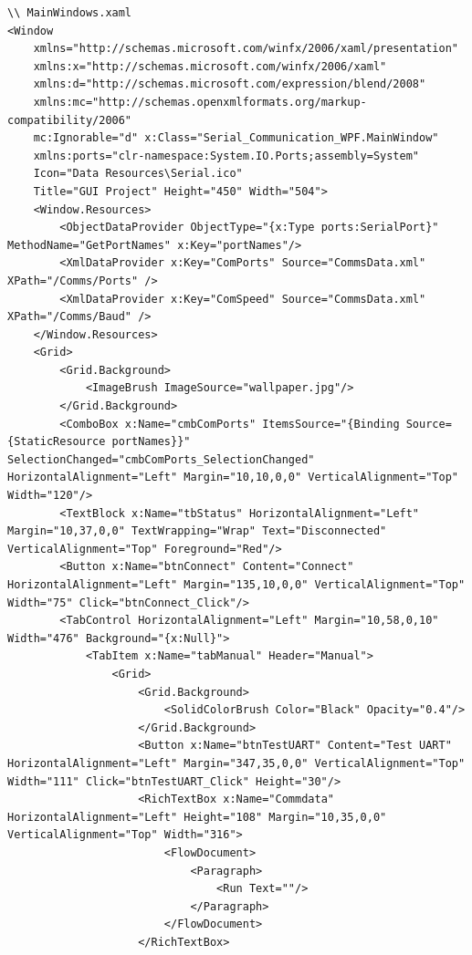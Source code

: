 \begin{lstlisting}
\\ MainWindows.xaml
<Window
	xmlns="http://schemas.microsoft.com/winfx/2006/xaml/presentation"
	xmlns:x="http://schemas.microsoft.com/winfx/2006/xaml"
    xmlns:d="http://schemas.microsoft.com/expression/blend/2008" 
    xmlns:mc="http://schemas.openxmlformats.org/markup-compatibility/2006"
    mc:Ignorable="d" x:Class="Serial_Communication_WPF.MainWindow"
    xmlns:ports="clr-namespace:System.IO.Ports;assembly=System"
    Icon="Data Resources\Serial.ico"
    Title="GUI Project" Height="450" Width="504">
    <Window.Resources>
        <ObjectDataProvider ObjectType="{x:Type ports:SerialPort}" MethodName="GetPortNames" x:Key="portNames"/>
        <XmlDataProvider x:Key="ComPorts" Source="CommsData.xml" XPath="/Comms/Ports" />
        <XmlDataProvider x:Key="ComSpeed" Source="CommsData.xml" XPath="/Comms/Baud" />
    </Window.Resources>
    <Grid>
        <Grid.Background>
            <ImageBrush ImageSource="wallpaper.jpg"/>
        </Grid.Background>
        <ComboBox x:Name="cmbComPorts" ItemsSource="{Binding Source={StaticResource portNames}}" SelectionChanged="cmbComPorts_SelectionChanged" HorizontalAlignment="Left" Margin="10,10,0,0" VerticalAlignment="Top" Width="120"/>
        <TextBlock x:Name="tbStatus" HorizontalAlignment="Left" Margin="10,37,0,0" TextWrapping="Wrap" Text="Disconnected" VerticalAlignment="Top" Foreground="Red"/>
        <Button x:Name="btnConnect" Content="Connect" HorizontalAlignment="Left" Margin="135,10,0,0" VerticalAlignment="Top" Width="75" Click="btnConnect_Click"/>
        <TabControl HorizontalAlignment="Left" Margin="10,58,0,10" Width="476" Background="{x:Null}">
            <TabItem x:Name="tabManual" Header="Manual">
                <Grid>
                    <Grid.Background>
                        <SolidColorBrush Color="Black" Opacity="0.4"/>
                    </Grid.Background>
                    <Button x:Name="btnTestUART" Content="Test UART" HorizontalAlignment="Left" Margin="347,35,0,0" VerticalAlignment="Top" Width="111" Click="btnTestUART_Click" Height="30"/>
                    <RichTextBox x:Name="Commdata" HorizontalAlignment="Left" Height="108" Margin="10,35,0,0" VerticalAlignment="Top" Width="316">
                        <FlowDocument>
                            <Paragraph>
                                <Run Text=""/>
                            </Paragraph>
                        </FlowDocument>
                    </RichTextBox>


\end{lstlisting}
